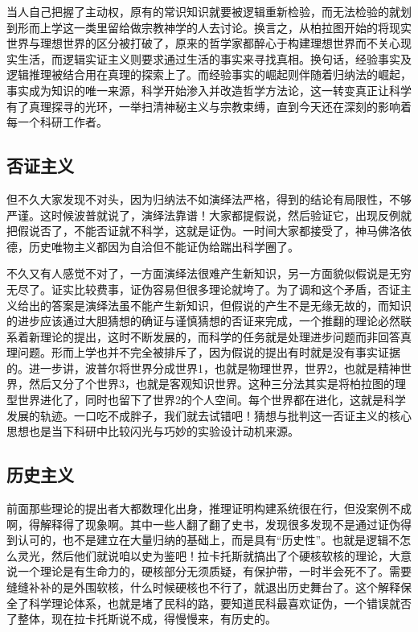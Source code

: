 \documentclass[]{tufte-book}
\begin{document}
当人自己把握了主动权，原有的常识知识就要被逻辑重新检验，而无法检验的就划到形而上学这一类里留给做宗教神学的人去讨论。换言之，从柏拉图开始的将现实世界与理想世界的区分被打破了，原来的哲学家都醉心于构建理想世界而不关心现实生活，而逻辑实证主义则要求通过生活的事实来寻找真相。换句话，经验事实及逻辑推理被结合用在真理的探索上了。而经验事实的崛起则伴随着归纳法的崛起，事实成为知识的唯一来源，科学开始渗入并改造哲学方法论，这一转变真正让科学有了真理探寻的光环，一举扫清神秘主义与宗教束缚，直到今天还在深刻的影响着每一个科研工作者。

\hypertarget{ux5426ux8bc1ux4e3bux4e49}{%
\subsection{否证主义}\label{ux5426ux8bc1ux4e3bux4e49}}

但不久大家发现不对头，因为归纳法不如演绎法严格，得到的结论有局限性，不够严谨。这时候波普就说了，演绎法靠谱！大家都提假说，然后验证它，出现反例就把假说否了，不能否证就不科学，这就是证伪。一时间大家都接受了，神马佛洛依德，历史唯物主义都因为自洽但不能证伪给踹出科学圈了。

不久又有人感觉不对了，一方面演绎法很难产生新知识，另一方面貌似假说是无穷无尽了。证实比较费事，证伪容易但很多理论就垮了。为了调和这个矛盾，否证主义给出的答案是演绎法虽不能产生新知识，但假说的产生不是无缘无故的，而知识的进步应该通过大胆猜想的确证与谨慎猜想的否证来完成，一个推翻的理论必然联系着新理论的提出，这时不断发展的，而科学的任务就是处理进步问题而非回答真理问题。形而上学也并不完全被排斥了，因为假说的提出有时就是没有事实证据的。进一步讲，波普尔将世界分成世界1，也就是物理世界，世界2，也就是精神世界，然后又分了个世界3，也就是客观知识世界。这种三分法其实是将柏拉图的理型世界进化了，同时也留下了世界2的个人空间。每个世界都在进化，这就是科学发展的轨迹。一口吃不成胖子，我们就去试错吧！猜想与批判这一否证主义的核心思想也是当下科研中比较闪光与巧妙的实验设计动机来源。

\hypertarget{ux5386ux53f2ux4e3bux4e49}{%
\subsection{历史主义}\label{ux5386ux53f2ux4e3bux4e49}}

前面那些理论的提出者大都数理化出身，推理证明构建系统很在行，但没案例不成啊，得解释得了现象啊。其中一些人翻了翻了史书，发现很多发现不是通过证伪得到认可的，也不是建立在大量归纳的基础上，而是具有``历史性''。也就是逻辑不怎么灵光，然后他们就说咱以史为鉴吧！拉卡托斯就搞出了个硬核软核的理论，大意说一个理论是有生命力的，硬核部分无须质疑，有保护带，一时半会死不了。需要缝缝补补的是外围软核，什么时候硬核也不行了，就退出历史舞台了。这个解释保全了科学理论体系，也就是堵了民科的路，要知道民科最喜欢证伪，一个错误就否了整体，现在拉卡托斯说不成，得慢慢来，有历史的。
\end{document}
